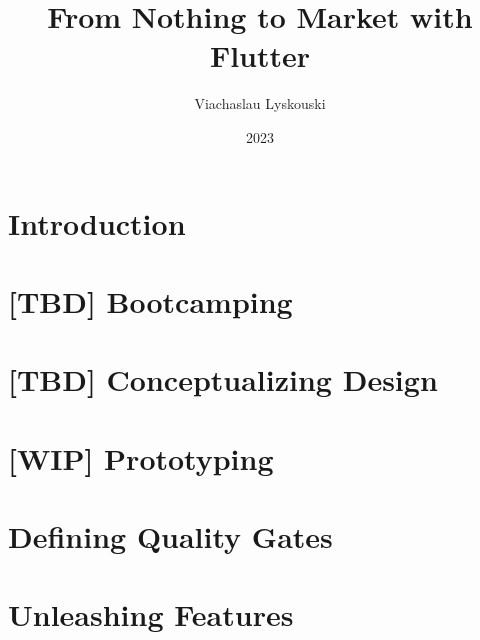 \documentclass[12pt, a4paper, twoside]{extreport}
\author{Viachaslau Lyskouski}
\title{From Nothing to Market with Flutter}
\date{2023}
\begin{document}


\maketitle

%

\tableofcontents



\newpage
\section*{Introduction}


\newpage
\section{[TBD] Bootcamping}





\newpage
\section{[TBD] Conceptualizing Design}


\newpage
\section{[WIP] Prototyping}







\newpage
\section{Defining Quality Gates}







\newpage
\section{Unleashing Features}






\end{document}
